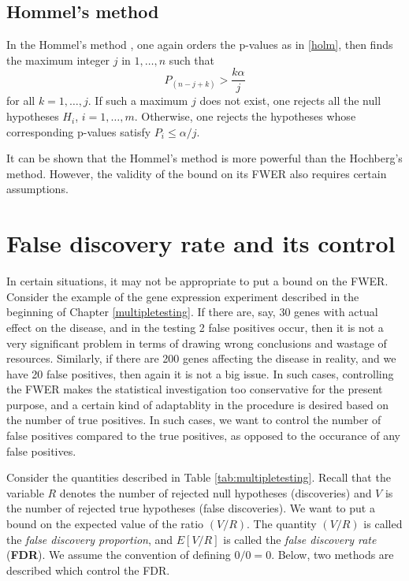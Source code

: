 \documentclass[
]{book}
\begin{document}
\hypertarget{hommel}{%
\subsection{Hommel's method}\label{hommel}}

In the Hommel's method \citep{hommel1988stagewise}, one again orders the p-values as in \ref{holm}, then finds the maximum integer \(j\) in \(1, \ldots, n\) such that \[P_{(n - j + k)} > \frac{k \alpha}{j}\] for all \(k = 1, \ldots, j\). If such a maximum \(j\) does not exist, one rejects all the null hypotheses \(H_i\), \(i = 1, \ldots, m\). Otherwise, one rejects the hypotheses whose corresponding p-values satisfy \(P_i \le \alpha / j\).

It can be shown that the Hommel's method is more powerful than the Hochberg's method. However, the validity of the bound on its FWER also requires certain assumptions.

\hypertarget{FDR}{%
\section{False discovery rate and its control}\label{FDR}}

In certain situations, it may not be appropriate to put a bound on the FWER. Consider the example of the gene expression experiment described in the beginning of Chapter \ref{multipletesting}. If there are, say, 30 genes with actual effect on the disease, and in the testing 2 false positives occur, then it is not a very significant problem in terms of drawing wrong conclusions and wastage of resources. Similarly, if there are 200 genes affecting the disease in reality, and we have 20 false positives, then again it is not a big issue. In such cases, controlling the FWER makes the statistical investigation too conservative for the present purpose, and a certain kind of adaptablity in the procedure is desired based on the number of true positives. In such cases, we want to control the number of false positives compared to the true positives, as opposed to the occurance of any false positives.

Consider the quantities described in Table \ref{tab:multipletesting}. Recall that the variable \(R\) denotes the number of rejected null hypotheses (discoveries) and \(V\) is the number of rejected true hypotheses (false discoveries). We want to put a bound on the expected value of the ratio \((V / R)\). The quantity \((V / R)\) is called the \emph{false discovery proportion}, and \(E[ V / R ]\) is called the \emph{false discovery rate} (\textbf{FDR}). We assume the convention of defining \(0 / 0 = 0\). Below, two methods are described which control the FDR.
\end{document}
